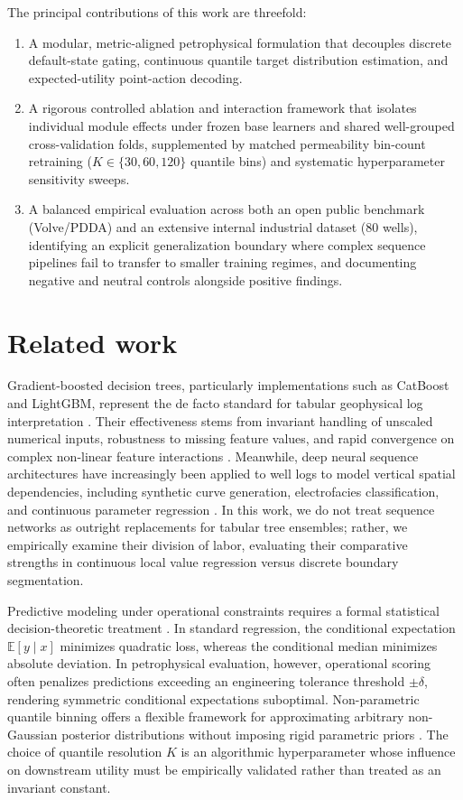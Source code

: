\documentclass[preprint,12pt,nopreprintline]{elsarticle}
\begin{document}
The principal contributions of this work are threefold:
\begin{enumerate}
\item A modular, metric-aligned petrophysical formulation that decouples discrete default-state gating, continuous quantile target distribution estimation, and expected-utility point-action decoding.
\item A rigorous controlled ablation and interaction framework that isolates individual module effects under frozen base learners and shared well-grouped cross-validation folds, supplemented by matched permeability bin-count retraining ($K \in \{30, 60, 120\}$ quantile bins) and systematic hyperparameter sensitivity sweeps.
\item A balanced empirical evaluation across both an open public benchmark (Volve/PDDA) and an extensive internal industrial dataset (80 wells), identifying an explicit generalization boundary where complex sequence pipelines fail to transfer to smaller training regimes, and documenting negative and neutral controls alongside positive findings.
\end{enumerate}

\section{Related work}
\label{sec:related}
Gradient-boosted decision trees, particularly implementations such as CatBoost and LightGBM, represent the de facto standard for tabular geophysical log interpretation \cite{ke2017lightgbm,prokhorenkova2018catboost}. Their effectiveness stems from invariant handling of unscaled numerical inputs, robustness to missing feature values, and rapid convergence on complex non-linear feature interactions \cite{anifowose2017,almudhafar2019}. Meanwhile, deep neural sequence architectures have increasingly been applied to well logs to model vertical spatial dependencies, including synthetic curve generation, electrofacies classification, and continuous parameter regression \cite{zhang2018synthetic,wang2020deep,song2021geological}. In this work, we do not treat sequence networks as outright replacements for tabular tree ensembles; rather, we empirically examine their division of labor, evaluating their comparative strengths in continuous local value regression versus discrete boundary segmentation.

Predictive modeling under operational constraints requires a formal statistical decision-theoretic treatment \cite{berger1985,bishop2006,gneiting2007}. In standard regression, the conditional expectation $\mathbb{E}[y \mid x]$ minimizes quadratic loss, whereas the conditional median minimizes absolute deviation. In petrophysical evaluation, however, operational scoring often penalizes predictions exceeding an engineering tolerance threshold $\pm \delta$, rendering symmetric conditional expectations suboptimal. Non-parametric quantile binning offers a flexible framework for approximating arbitrary non-Gaussian posterior distributions without imposing rigid parametric priors \cite{gneiting2007}. The choice of quantile resolution $K$ is an algorithmic hyperparameter whose influence on downstream utility must be empirically validated rather than treated as an invariant constant.
\end{document}
